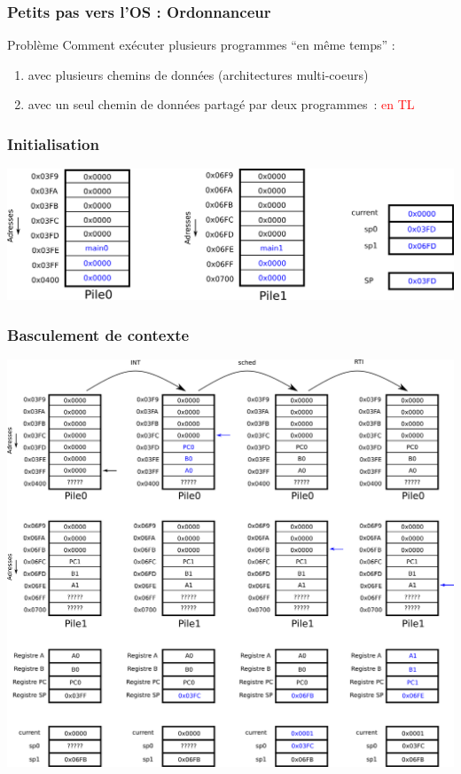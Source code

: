 \documentclass{beamer}
\begin{document}
\begin{frame}
\frametitle{Petits pas vers l'OS : Ordonnanceur}

\begin{block}{Problème}
Comment exécuter plusieurs programmes ``en même temps'' :
\begin{enumerate}
\item avec plusieurs chemins de données (architectures multi-coeurs)
\item avec un seul chemin de données partagé par deux programmes~: \textcolor{red}{en TL} 
\end{enumerate}
\end{block}

\end{frame}

\begin{frame}

\frametitle{Initialisation}

\includegraphics[width=\linewidth]{Figs/stack_ordonnanceur_init.png}

\end{frame}

\begin{frame}

\frametitle{Basculement de contexte}

\includegraphics[width=\linewidth]{Figs/stack_ordonnanceur.png}

\end{frame}
\end{document}
